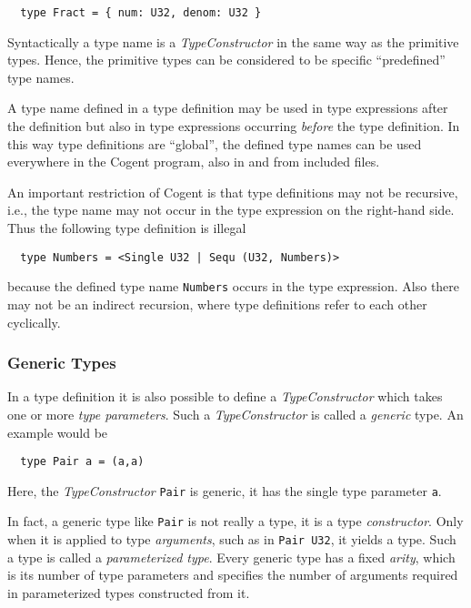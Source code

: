 \documentclass[a4paper]{report}
\newcommand{\code}[1]{\textnormal{\texttt{#1}}}
\newcommand{\cogent}{Cogent\xspace}
\begin{document}
\begin{verbatim}
  type Fract = { num: U32, denom: U32 }
\end{verbatim}

Syntactically a type name is a \textit{TypeConstructor} in the same way as the primitive types. Hence, the 
primitive types can be considered to be specific ``predefined'' type names.

A type name defined in a type definition may be used in type expressions after the definition but also in type
expressions occurring \textit{before} the type definition. In this way type definitions are ``global'', the 
defined type names can be used everywhere in the \cogent program, \cbstart also in and from included files.\cbend

An important restriction of \cogent is that type definitions may not be recursive, i.e., the type name may
not occur in the type expression on the right-hand side. Thus the following type definition is illegal
\begin{verbatim}
  type Numbers = <Single U32 | Sequ (U32, Numbers)>
\end{verbatim}
because the defined type name \code{Numbers} occurs in the type expression. Also there may not be an indirect
recursion, where type definitions refer to each other cyclically.

\subsubsection{Generic Types}

In a type definition it is also possible to define a \textit{TypeConstructor} which takes one or more
\textit{type parameters}. Such a \textit{TypeConstructor} is called a \textit{generic} type. 
An example would be

\begin{verbatim}
  type Pair a = (a,a)
\end{verbatim}

Here, the \textit{TypeConstructor} \code{Pair} is generic, it has the single type parameter \code{a}.

In fact, a generic type like \code{Pair} is not really a type, it is a type \textit{constructor}. Only when it
is applied to type \textit{arguments}, such as in \texttt{Pair U32}, it yields a type. Such a type is called
a \textit{parameterized type}. Every generic type has a fixed \textit{arity}, which is its number of type
parameters and specifies the number of arguments required in parameterized types constructed from it.
\end{document}
